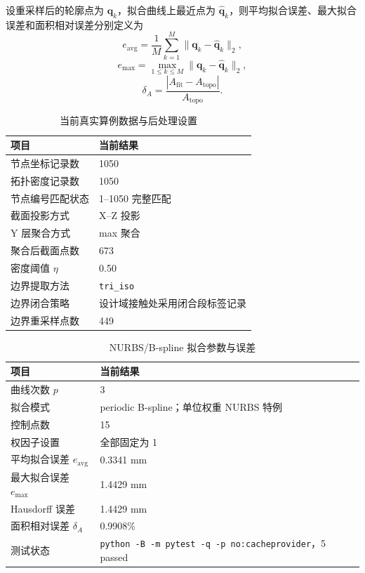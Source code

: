\documentclass{FRB-style}
\newcommand{\codepath}[1]{\texttt{#1}}
\begin{document}
设重采样后的轮廓点为 $\mathbf{q}_k$，拟合曲线上最近点为 $\hat{\mathbf{q}}_k$，则平均拟合误差、最大拟合误差和面积相对误差分别定义为
\begin{equation}
e_{\mathrm{avg}}=\frac{1}{M}\sum_{k=1}^{M}\|\mathbf{q}_k-\hat{\mathbf{q}}_k\|_2,
\end{equation}
\begin{equation}
e_{\max}=\max_{1\leq k\leq M}\|\mathbf{q}_k-\hat{\mathbf{q}}_k\|_2,
\end{equation}
\begin{equation}
\delta_A=\frac{|A_{\mathrm{fit}}-A_{\mathrm{topo}}|}{A_{\mathrm{topo}}}.
\end{equation}

\begin{table}[H]
\centering
\caption{当前真实算例数据与后处理设置}
\begin{tabularx}{\textwidth}{p{}X}
\toprule
项目 & 当前结果 \\
\midrule
节点坐标记录数 & 1050 \\
拓扑密度记录数 & 1050 \\
节点编号匹配状态 & 1--1050 完整匹配 \\
截面投影方式 & X--Z 投影 \\
Y 层聚合方式 & max 聚合 \\
聚合后截面点数 & 673 \\
密度阈值 $\eta$ & 0.50 \\
边界提取方法 & \codepath{tri\_iso} \\
边界闭合策略 & 设计域接触处采用闭合段标签记录 \\
边界重采样点数 & 449 \\
\bottomrule
\end{tabularx}
\end{table}

\begin{table}[H]
\centering
\caption{NURBS/B-spline 拟合参数与误差}
\begin{tabularx}{\textwidth}{p{}X}
\toprule
项目 & 当前结果 \\
\midrule
曲线次数 $p$ & 3 \\
拟合模式 & periodic B-spline；单位权重 NURBS 特例 \\
控制点数 & 15 \\
权因子设置 & 全部固定为 1 \\
平均拟合误差 $e_{\mathrm{avg}}$ & 0.3341 mm \\
最大拟合误差 $e_{\max}$ & 1.4429 mm \\
Hausdorff 误差 & 1.4429 mm \\
面积相对误差 $\delta_A$ & 0.9908\% \\
测试状态 & \codepath{python -B -m pytest -q -p no:cacheprovider}，5 passed \\
\bottomrule
\end{tabularx}
\end{table}
\end{document}
